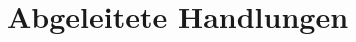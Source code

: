 
\chapter{Abgeleitete Handlungen}

\begin{comment}
Das Ziel in diesem Kapitel ist es, die in den vorhergehenden Kapiteln ausgearbeiteten Selbst- und Fremdeinschätzungen in Kontrast zu setzen. Dazu wird die jeweilige Selbsteinschätzung eines jeden Teammitgliedes mit den Fremdeinschätzungen der beiden anderen verglichen. Bei grossen Abweichungen werden diese versucht zu Begründen.

\subsection*{Pascal Horat}
Bei Pascal hat es von allen Vergleichen die geringsten Unterschiede gegeben. So hat er sich selbst als Koordinator eingeschätzt, diese Rolle wurde auch von den anderen beiden Teammitgliedern für ihn als erstes genannt. Siehe Kapitel \ref{Fremdeinschaetzung} ab Seite \pageref{Fremdeinschaetzung}. 

\subsection*{Steve Gerome Kamga}
Gerome wurde von Gökhan als Vollender eingeschätzt, wobei er dies auch als dritter Punkt in seiner Selbsteinschätzung erwähnte. \\
Von Pascal wurden ihm die Rollen des Pragmatikers und Ausgleichers zugeteilt. Als Ausgleicher konnte sich Gerome jedoch nicht bewerten, so war diese Rolle nur an vierter Stelle in der Auswertung.

\subsection*{Gökhan Kaya}
Die Teamkollegen von Gökhan haben ihn als Ausgleicher und Bewerter betrachtet. Bei der Rolle des Ausgleichers hatte es eine grosse Übereinstimmung gegeben, jedoch hatte Gökhan bei seiner Selbsteinschätzung den Bewerter an letzter Stelle. Die Rolle des Bewerters wurde Gökhan von Gerome anhand des Belbin Fragebogens zugeteilt. Gemäss Rollenbeschreibung von Belbin zeichnet den Bewerter seine zurückhaltende Position, aber auch sein klares Urteil bezüglich Teamentscheidungen aus. Dieser Auszug stimmt laut Aussage des Beurteilenden sehr genau. Hingegen wird Gökhan von ihm überhaupt nicht als Bremser, wie dies in der Rollenbeschreibung steht, eingeschätzt.
\end{comment}
